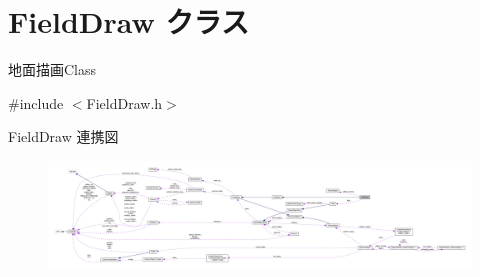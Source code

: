 \hypertarget{class_field_draw}{}\section{Field\+Draw クラス}
\label{class_field_draw}


地面描画\+Class  




{\ttfamily \#include $<$Field\+Draw.\+h$>$}



Field\+Draw 連携図\nopagebreak
\begin{figure}[H]
\begin{center}
\leavevmode
\includegraphics[width=350pt]{class_field_draw__coll__graph}
\end{center}
\end{figure}
